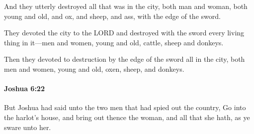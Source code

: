			\begin{versebox}
					\item[BHS] 
					\item[ASV] And they utterly destroyed all that was in the city, both man and woman, both young and old, and ox, and sheep, and ass, with the edge of the sword.
					\item[NIV] They devoted the city to the LORD and destroyed with the sword every living thing in it—men and women, young and old, cattle, sheep and donkeys.
					\item[NRSV] Then they devoted to destruction by the edge of the sword all in the city, both men and women, young and old, oxen, sheep, and donkeys.
			\end{versebox}

		\paragraph{Joshua 6:22} %
			\label{JOSHUA-6-22}

			But Joshua had said unto the two men that had spied out the country, Go into the harlot’s house, and bring out thence the woman, and all that she hath, as ye sware unto her.

